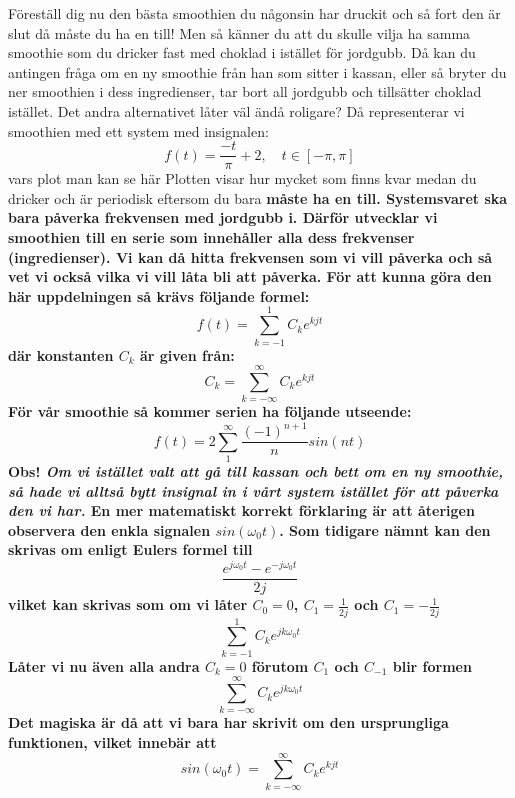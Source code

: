 \documentclass{article}
\begin{document}
Föreställ dig nu den bästa smoothien du någonsin har druckit och så fort den är slut då måste du ha en till! Men så känner du att du skulle vilja ha samma smoothie som du dricker fast med choklad i istället för jordgubb. Då kan du antingen fråga om en ny smoothie från han som sitter i kassan, eller så bryter du ner smoothien i dess ingredienser, tar bort all jordgubb och tillsätter choklad istället. Det andra alternativet låter väl ändå roligare?
Då representerar vi smoothien med ett system med insignalen:
$$ f(t) = \frac{-t}{\pi} + 2, \quad t \in [-\pi,\pi] $$
vars plot man kan se här %
Plotten visar hur mycket som finns kvar medan du dricker och är periodisk eftersom du bara \bf{måste} ha en till. Systemsvaret ska bara påverka frekvensen med jordgubb i. Därför utvecklar vi smoothien till en serie som innehåller alla dess frekvenser (ingredienser). Vi kan då hitta frekvensen som vi vill påverka och så vet vi också vilka vi vill låta bli att påverka. För att kunna göra den här uppdelningen så krävs följande formel:
$$ f(t) = \sum_{k=-1}^1 C_k e^{k j t} $$
där konstanten $C_k$ är given från:
$$C_k = \sum_{k=-\infty}^{\infty} C_k e^{k j t}$$ %
För vår smoothie så kommer serien ha följande utseende:
$$f(t) = 2 \sum_{1}^{\infty} \frac{(-1)^{n+1}}{n} sin(n t) $$
Obs! \emph{Om vi istället valt att gå till kassan och bett om en ny smoothie, så hade vi alltså bytt insignal in i vårt system istället för att påverka den vi har.}
\newline
En mer matematiskt korrekt förklaring är att återigen observera den enkla signalen $sin(\omega_0 t)$. Som tidigare nämnt kan den skrivas om enligt Eulers formel till
$$ \frac{e^{j \omega_0 t} - e^{-j \omega_0 t}}{2j}$$
vilket kan skrivas som om vi låter $C_0=0$, $C_{1}=\frac{1}{2j}$ och $C_{1}=-\frac{1}{2j}$
$$ \sum_{k=-1}^1 C_k e^{j k \omega_0 t} $$
Låter vi nu även \bf{alla} andra $C_k = 0$ förutom  $C_1$ och $C_{-1}$ blir formen
$$ \sum_{k=-\infty}^{\infty} C_k e^{j k \omega_0 t} $$
Det magiska är då att vi bara har skrivit om den ursprungliga funktionen, vilket innebär att
$$ sin(\omega_0 t) = \sum_{k=-\infty}^{\infty} C_k e^{k j t} $$
\end{document}
